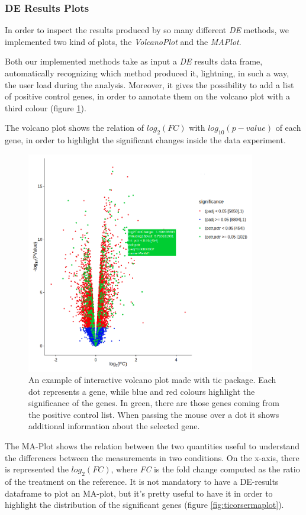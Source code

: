 \subsubsection{DE Results Plots}
In order to inspect the results produced by so many different \textit{DE} methods, we implemented two kind of plots, the \textit{VolcanoPlot} and the \textit{MAPlot}.

Both our implemented methods take as input a \textit{DE} results data frame, automatically recognizing which method produced it, lightning, in such a way, the user load during the analysis.
Moreover, it gives the possibility to add a list of positive control genes, in order to annotate them on the volcano plot with a third colour (figure \ref{fig:ticorservolcano}).

The volcano plot shows the relation of $log_2(FC)$ with $log_{10}(p-value)$ of each gene, in order to highlight the significant changes inside the data experiment.

\begin{figure}[H]
\centering
\includegraphics[width=10cm, keepaspectratio]{img/ticorser/volcano_example.png}
\caption[ticorser volcano]{An example of interactive volcano plot made with \gls{tic} package. Each dot represents a gene, while blue and red colours highlight the significance of the genes. In green, there are those genes coming from the positive control list. When passing the mouse over a dot it shows additional information about the selected gene.}
\label{fig:ticorservolcano}
\end{figure}

The MA-Plot shows the relation between the two quantities useful to understand the differences between the measurements in two conditions.
On the x-axis, there is represented the $log_2(FC)$, where \textit{FC} is the fold change computed as the ratio of the treatment on the reference.
It is not mandatory to have a DE-results dataframe to plot an MA-plot, but it's pretty useful to have it in order to highlight the distribution of the significant genes (figure \ref{fig:ticorsermaplot}).
 
